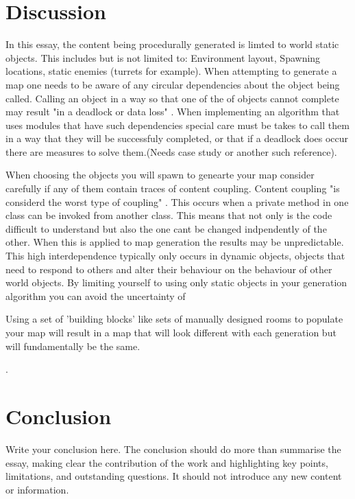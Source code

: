 \documentclass{scrartcl}
\begin{document}
\section{Discussion}
In this essay, the content being procedurally generated is limted to world static objects. This includes but is not limited to: Environment layout, Spawning locations, static enemies (turrets for example). When attempting to generate a map one needs to be aware of any circular dependencies about the object being called. Calling an object in a way so that one of the of objects cannot complete may result "in a deadlock or data loss" \cite {nair2016solving}. When implementing an algorithm that uses modules that have such dependencies special care must be takes to call them in a way that they will be successfuly completed, or that if a deadlock does occur there are measures to solve them.(Needs case study or another such reference).

When choosing the objects you will spawn to genearte your map consider carefully if any of them contain traces of content coupling. Content coupling "is considerd the worst type of coupling" \cite[p. 95]{briand1999unified}. This occurs when a private method in one class can be invoked from another class. This means that not only is the code difficult to understand but also the one cant be changed indpendently of the other. When this is applied to map generation the results may be unpredictable. This high interdependence typically only occurs in dynamic objects, objects that need to respond to others and alter their behaviour on the behaviour of other world objects. By limiting yourself to using only static objects in your generation algorithm you can avoid the uncertainty of 

 Using a set of 'building blocks' like sets of manually designed rooms to populate your map will result in a map that will look different with each generation but will fundamentally be the same. 



.
\section{Conclusion}

Write your conclusion here. The conclusion should do more than summarise the essay, making clear the contribution of the work and highlighting key points, limitations, and outstanding questions. It should not introduce any new content or information.



\end{document}
